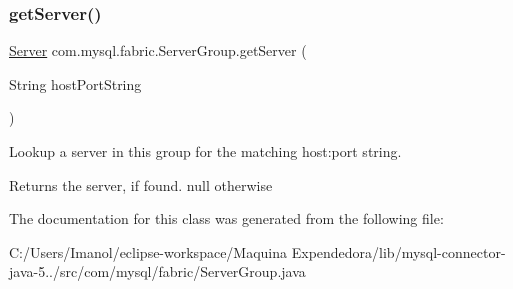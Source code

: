 \subsubsection{\texorpdfstring{get\+Server()}{getServer()}}
{\footnotesize\ttfamily \mbox{\hyperlink{classcom_1_1mysql_1_1fabric_1_1_server}{Server}} com.\+mysql.\+fabric.\+Server\+Group.\+get\+Server (\begin{DoxyParamCaption}\item[{String}]{host\+Port\+String }\end{DoxyParamCaption})}

Lookup a server in this group for the matching host\+:port string.

\begin{DoxyReturn}{Returns}
the server, if found. null otherwise 
\end{DoxyReturn}


The documentation for this class was generated from the following file\+:\begin{DoxyCompactItemize}
\item 
C\+:/\+Users/\+Imanol/eclipse-\/workspace/\+Maquina Expendedora/lib/mysql-\/connector-\/java-\/5../src/com/mysql/fabric/Server\+Group.\+java\end{DoxyCompactItemize}
